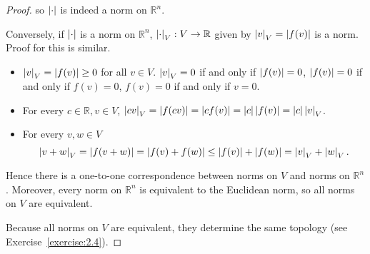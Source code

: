 \begin{proof}
	so $\left\vert{\cdot}\right\vert$ is indeed a norm on $\mathbb{R}^{n}$.

	Conversely, if $\left\vert{\cdot}\right\vert$ is a norm on $\mathbb{R}^{n}$, $\left\vert{\cdot}\right\vert_{V}: V\to \mathbb{R}$ given by $\left\vert{v}\right\vert_{V} = \left\vert{f(v)}\right\vert$ is a norm. Proof for this is similar.
	\begin{itemize}
		\item $\left\vert{v}\right\vert_{V} = \left\vert{f(v)}\right\vert \geq 0$ for all $v\in V$. $\left\vert{v}\right\vert_{V} = 0$ if and only if $\left\vert{f(v)}\right\vert = 0$, $\left\vert{f(v)}\right\vert = 0$ if and only if $f(v) = 0$, $f(v) = 0$ if and only if $v = 0$.
		\item For every $c\in \mathbb{R}, v\in V$, $\left\vert{cv}\right\vert_{V} = \left\vert{f(cv)}\right\vert = \left\vert{cf(v)}\right\vert = \left\vert{c}\right\vert\left\vert{f(v)}\right\vert = \left\vert{c}\right\vert\left\vert{v}\right\vert_{V}$.
		\item For every $v, w\in V$
		      \begin{equation*}
			      \left\vert{v + w}\right\vert_{V} = \left\vert{f(v + w)}\right\vert = \left\vert{f(v) + f(w)}\right\vert \leq \left\vert{f(v)}\right\vert + \left\vert{f(w)}\right\vert = \left\vert{v}\right\vert_{V} + \left\vert{w}\right\vert_{V}.
		      \end{equation*}
	\end{itemize}

	Hence there is a one-to-one correspondence between norms on $V$ and norms on $\mathbb{R}^{n}$. Moreover, every norm on $\mathbb{R}^{n}$ is equivalent to the Euclidean norm, so all norms on $V$ are equivalent.

	Because all norms on $V$ are equivalent, they determine the same topology (see Exercise~\ref{exercise:2.4}).
\end{proof}
